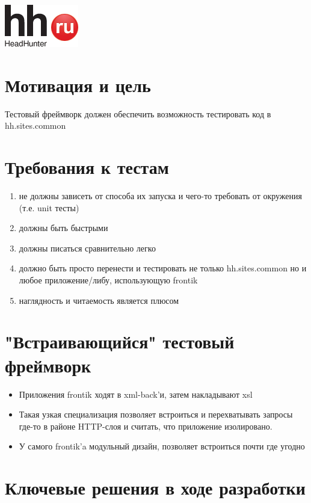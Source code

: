 \documentclass[12pt]{article}
\begin{document}
\includegraphics{logo.png}
\TitleSlide

\section{Мотивация и цель}
Тестовый фреймворк должен обеспечить возможность тестировать код в hh.sites.common

\section{Требования к тестам}

\begin{enumerate}
\item не должны зависеть от способа их запуска и чего-то требовать от окружения (т.е. unit тесты)
\item должны быть быстрыми
\item должны писаться сравнительно легко
\item должно быть просто перенести и тестировать не только hh.sites.common но и любое приложение/либу, использующую frontik
\item наглядность и читаемость является плюсом
\end{enumerate}

\section{"Встраивающийся" тестовый фреймворк}

\begin{itemize}
\item Приложения frontik ходят в xml-back'и, затем накладывают xsl
\item Такая узкая специализация позволяет встроиться и перехватывать запросы где-то в районе HTTP-слоя и считать, что приложение изолировано.
\item У самого frontik'a модульный дизайн, позволяет встроиться почти где угодно

\end{itemize}

\section{Ключевые решения в ходе разработки}
\end{document}
